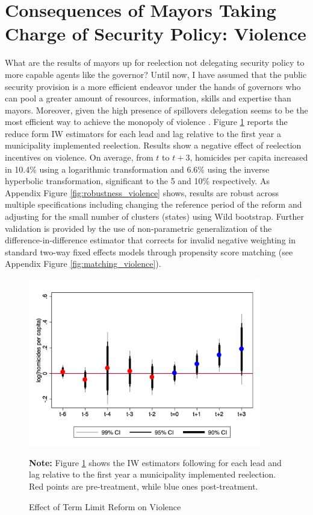 \section{Consequences of Mayors Taking Charge of Security Policy: Violence \label{sec:unintended}}


What are the results of mayors up for reelection not delegating security policy to more capable agents like the governor? Until now, I have assumed that the public security provision is a more efficient endeavor under the hands of governors who can pool a greater amount of resources, information, skills and expertise than mayors. Moreover, given the high presence of spillovers delegation seems to be the most efficient way to achieve the monopoly of violence \citep{oates_1972}. Figure \ref{fig:as_violence} reports the reduce form IW estimators for each lead and lag relative to the first year a municipality implemented reelection. Results show a negative effect of reelection incentives on violence. On average, from $t$ to $t+3$, homicides per capita increased in 10.4\% using a logarithmic transformation and 6.6\% using the inverse hyperbolic transformation, significant to the 5 and 10\% respectively. As Appendix Figure \ref{fig:robustness_violence} shows, results are robust across multiple specifications including changing the reference period of the reform and adjusting for the small number of clusters (states) using Wild bootstrap. Further validation is provided by the use of \citet{imai_etal_2020} non-parametric generalization of the difference-in-difference estimator that corrects for invalid negative weighting in standard two-way fixed effects models through propensity score matching (see Appendix Figure \ref{fig:matching_violence}). 


\begin{figure}[h] 
\centering
 \caption{Effect of Term Limit Reform on Violence}
 \label{fig:as_violence}
\includegraphics[width=0.9\textwidth]{Figures/catts_homicides.png}
       \captionsetup{justification=centering}
       
 \textbf{Note:} Figure \ref{fig:as_violence} shows the IW estimators following \citet{abraham_sun_2020} for each lead and lag relative to the first year a municipality implemented reelection. Red points are pre-treatment, while blue ones post-treatment. 
    
\end{figure}    

